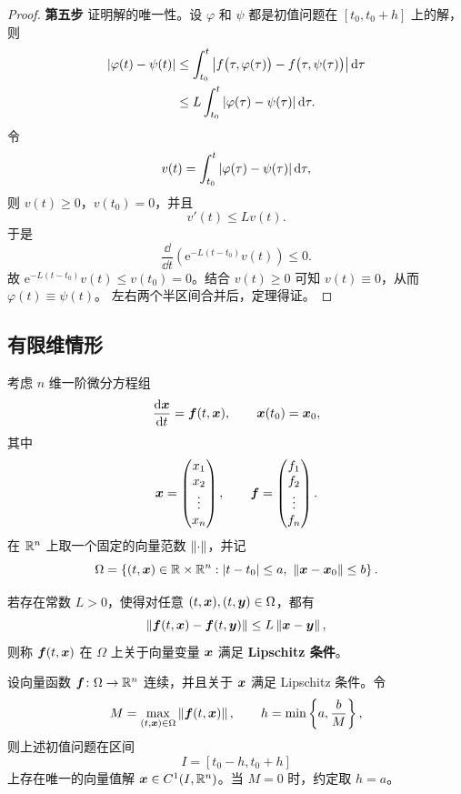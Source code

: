 \begin{proof}
	\noindent\textbf{第五步}\quad
	证明解的唯一性。设 $\varphi$ 和 $\psi$ 都是初值问题在
	$[t_0,t_0+h]$ 上的解，则
	\[
		\begin{aligned}
			\left| \varphi(t)-\psi(t) \right|
			&\leq\int_{t_0}^{t}
			\left| 
				f\bigl(\tau,\varphi(\tau)\bigr)
				-f\bigl(\tau,\psi(\tau)\bigr)
			 \right|\mathrm{d}\tau\\
			&\leq L\int_{t_0}^{t}
			\left| \varphi(\tau)-\psi(\tau) \right|\mathrm{d}\tau.
		\end{aligned}
	\]
	令
	\[
		v(t)=\int_{t_0}^{t}
		\left| \varphi(\tau)-\psi(\tau) \right|\mathrm{d}\tau,
	\]
	则 $v(t)\geq0$，$v(t_0)=0$，并且
	\[
		v'(t)\leq Lv(t).
	\]
	于是
	\[
		\dfrac{\dd}{\dd t}
		\left(\mathrm{e}^{-L(t-t_0)}v(t)\right)\leq0.
	\]
	故 $\mathrm{e}^{-L(t-t_0)}v(t)\leq v(t_0)=0$。结合 $v(t)\geq0$
	可知 $v(t)\equiv0$，从而 $\varphi(t)\equiv\psi(t)$。
	左右两个半区间合并后，定理得证。
\end{proof}


\subsection*{有限维情形}

考虑 $n$ 维一阶微分方程组
\[
	\dfrac{\mathrm{d}\boldsymbol{x}}{\mathrm{d} t}
	=\boldsymbol{f}(t,\boldsymbol{x}),
	\qquad
	\boldsymbol{x}(t_0)=\boldsymbol{x}_0,
\]
其中
\[
	\boldsymbol{x}
	=\begin{pmatrix}
		x_1\\
		x_2\\
		\vdots\\
		x_n
	\end{pmatrix},
	\qquad
	\boldsymbol{f}
	=\begin{pmatrix}
		f_1\\
		f_2\\
		\vdots\\
		f_n
	\end{pmatrix}.
\]
在 $\mathbb{R}^n$ 上取一个固定的向量范数 $\left\| \cdot \right\|$，并记
\[
	\Omega
	=\left\{
		(t,\vect{x})\in\R\times\R^n:
		\abs{t-t_0}\leq a,\ 
		\norm{\vect{x}-\vect{x}_0}\leq b
	\right\}.
\]

\begin{definition}\label{def:向量函数的Lipschitz条件}
	若存在常数 $L>0$，使得对任意
	$(t,\boldsymbol{x}),(t,\boldsymbol{y})\in\Omega$，都有
	\[
		\left\| 
			\boldsymbol{f}(t,\boldsymbol{x})
			-\boldsymbol{f}(t,\boldsymbol{y})
		 \right\|
		\leq
		L\left\| \boldsymbol{x}-\boldsymbol{y} \right\|,
	\]
	则称 $\boldsymbol{f}(t,\boldsymbol{x})$ 在 $\Omega$ 上关于向量变量
	$\boldsymbol{x}$ 满足 \textbf{Lipschitz 条件}。
\end{definition}

\begin{theorem}
	\label{thm:有限维Picard存在唯一性定理}
	设向量函数
	$\boldsymbol{f}\colon\Omega\to\mathbb{R}^n$ 连续，并且关于 $\boldsymbol{x}$
	满足 Lipschitz 条件。令
	\[
		M=\max_{(t,\boldsymbol{x})\in\Omega}
		\left\| \boldsymbol{f}(t,\boldsymbol{x}) \right\|,
		\qquad
		h=\min\left\{a,\dfrac{b}{M}\right\},
	\]
	则上述初值问题在区间
	\[
		I=[t_0-h,t_0+h]
	\]
	上存在唯一的向量值解
	$\boldsymbol{x}\in C^1(I,\mathbb{R}^n)$。当 $M=0$ 时，约定取 $h=a$。
\end{theorem}

